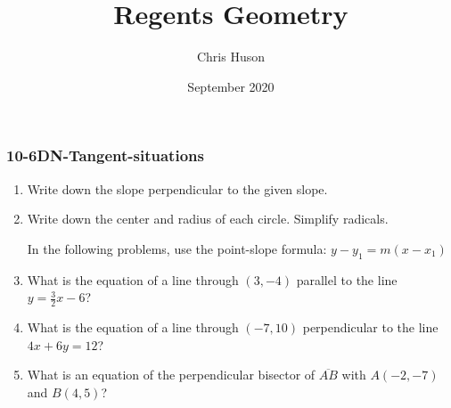 \documentclass[12pt, twoside]{article}
\title{Regents Geometry}
\author{Chris Huson}
\date{September 2020}
\begin{document}
\subsubsection*{10-6DN-Tangent-situations}
\begin{enumerate}
\item Write down the slope perpendicular to the given slope. \vspace{0.5cm}
  \begin{enumerate}
  \end{enumerate} \vspace{1cm}

\item Write down the center and radius of each circle. Simplify radicals.
  \begin{enumerate}
  \end{enumerate}  \vspace{2cm}

  In the following problems, use the point-slope formula: $y-y_1=m (x-x_1)$
\item What is the equation of a line through $(3,-4)$ parallel to the line $y=\frac{3}{2}x-6$?  \vspace{2cm}
\item What is the equation of a line through $(-7,10)$ perpendicular to the line $4x+6y=12$?  \vspace{3cm}
  
\item What is an equation of the perpendicular bisector of $\overline{AB}$ with $A(-2,-7)$ and $B(4,5)$? \vspace{2cm}

\newpage


\end{enumerate}
\end{document}
